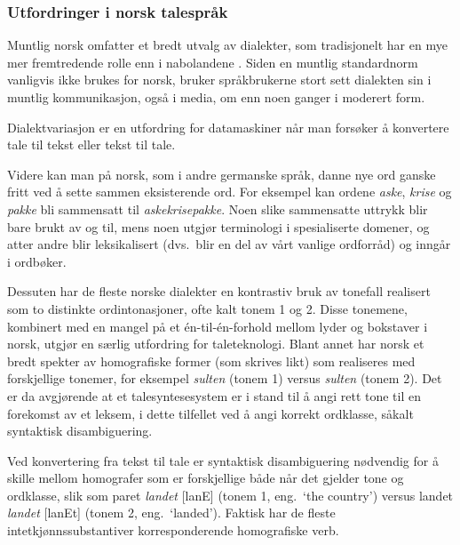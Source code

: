 \begin{multicols}{2}
\subsubsection{Utfordringer i norsk talespråk}
Muntlig norsk omfatter et bredt utvalg av dialekter, som tradisjonelt har en mye mer fremtredende rolle enn i nabolandene \cite{stm35:2008}.
Siden en muntlig standardnorm vanligvis ikke brukes for norsk, bruker språkbrukerne stort sett dialekten sin i muntlig kommunikasjon, også i media, om enn noen ganger i moderert form. 

Dialektvariasjon er en utfordring for datamaskiner når man forsøker å konvertere tale til tekst eller tekst til tale.


Videre kan man på norsk, som i andre germanske språk, danne nye ord ganske fritt ved å sette sammen eksisterende ord. For eksempel kan ordene \textit{aske}, \textit{krise} og \textit{pakke} bli sammensatt til \textit{askekrisepakke}.
Noen slike sammensatte uttrykk blir bare brukt av og til, mens noen utgjør terminologi i spesialiserte domener, og atter andre blir leksikalisert (dvs.~blir en del av vårt vanlige ordforråd) og inngår i ordbøker.

Dessuten har de fleste norske dialekter en kontrastiv bruk av tonefall realisert som to distinkte ordintonasjoner, ofte kalt tonem 1 og 2. Disse tonemene, kombinert med en mangel på et én-til-én-forhold mellom lyder og bokstaver i norsk, utgjør en særlig utfordring for taleteknologi. Blant annet har norsk et bredt spekter av homografiske former (som skrives likt) som realiseres med forskjellige tonemer, for eksempel  \textit{sulten} (tonem 1) versus \textit{sulten} (tonem 2). Det er da avgjørende at et talesyntesesystem er i stand til å angi rett tone til en forekomst av et leksem, i dette tilfellet ved å angi korrekt ordklasse, såkalt syntaktisk disambiguering. 

Ved konvertering fra tekst til tale er syntaktisk disambiguering nødvendig for å skille mellom homografer som er forskjellige både når det gjelder tone og ordklasse, slik som paret \textit{landet} {[}lanE{]} (tonem 1, eng.~`the country') versus landet \textit{landet} {[}lanEt{]} (tonem 2, eng.~`landed'). 
Faktisk har de fleste intetkjønnssubstantiver korresponderende homografiske verb.


\end{multicols}
